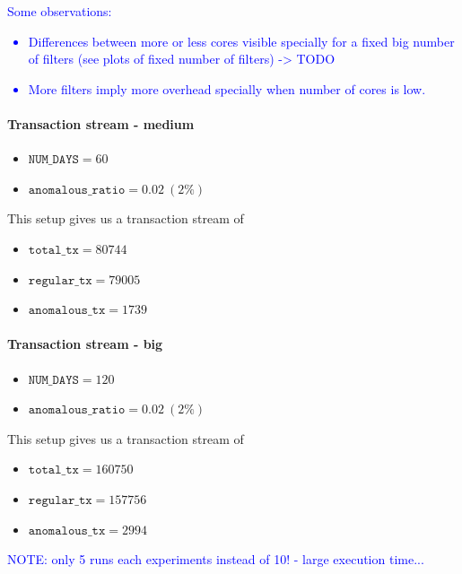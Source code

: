 \textcolor{blue}{
Some observations:
\begin{itemize}
    \item Differences between  more or less cores visible specially for a fixed big number of filters (see plots of fixed number of filters) -> TODO
    \item More filters imply more overhead specially when number of cores is low.
\end{itemize}
}

\paragraph{Transaction stream - medium\\}

\begin{itemize}
  \item $\texttt{NUM\_DAYS} = 60$
  \item $\texttt{anomalous\_ratio} = 0.02\ (2\%)$ 
\end{itemize}

This setup gives us a transaction stream of 
\begin{itemize}
  \item $\texttt{total\_tx} = 80744$
  \item $\texttt{regular\_tx} = 79005$
  \item $\texttt{anomalous\_tx} = 1739$
\end{itemize}

\paragraph{Transaction stream - big\\}

\begin{itemize}
  \item $\texttt{NUM\_DAYS} = 120$
  \item $\texttt{anomalous\_ratio} = 0.02\ (2\%)$ 
\end{itemize}

This setup gives us a transaction stream of 
\begin{itemize}
  \item $\texttt{total\_tx} = 160750$
  \item $\texttt{regular\_tx} = 157756$
  \item $\texttt{anomalous\_tx} = 2994$
\end{itemize}

\textcolor{blue}{NOTE: only 5 runs each experiments instead of 10! - large execution time...}

